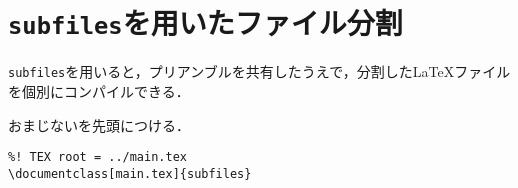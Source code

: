 \documentclass[main.tex]{subfiles}
\begin{document}
\section{\texttt{subfiles}を用いたファイル分割}

\texttt{subfiles}を用いると，プリアンブルを共有したうえで，分割した{\LaTeX}ファイルを個別にコンパイルできる．

おまじないを先頭につける．
\begin{lstlisting}
%! TEX root = ../main.tex
\documentclass[main.tex]{subfiles}    
\end{lstlisting}
\end{document}
